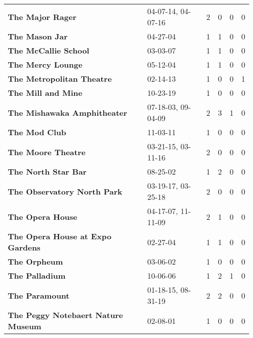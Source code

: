 \begin{supertabular}{p{0.4\textwidth}p{0.3\textwidth}p{0.05\textwidth}p{0.05\textwidth}p{0.05\textwidth}p{0.05\textwidth}}
                                             \textbf{The Major Rager} &  04-07-14, 04-07-16 &  2 &  0 &  0 &  0 \\
                                               \textbf{The Mason Jar} &            04-27-04 &  1 &  1 &  0 &  0 \\
                                         \textbf{The McCallie School} &            03-03-07 &  1 &  1 &  0 &  0 \\
                                            \textbf{The Mercy Lounge} &            05-12-04 &  1 &  1 &  0 &  0 \\
                                    \textbf{The Metropolitan Theatre} &            02-14-13 &  1 &  0 &  0 &  1 \\
                                           \textbf{The Mill and Mine} &            10-23-19 &  1 &  0 &  0 &  0 \\
                                  \textbf{The Mishawaka Amphitheater} &  07-18-03, 09-04-09 &  2 &  3 &  1 &  0 \\
                                                \textbf{The Mod Club} &            11-03-11 &  1 &  0 &  0 &  0 \\
                                           \textbf{The Moore Theatre} &  03-21-15, 03-11-16 &  2 &  0 &  0 &  0 \\
                                          \textbf{The North Star Bar} &            08-25-02 &  1 &  2 &  0 &  0 \\
                                  \textbf{The Observatory North Park} &  03-19-17, 03-25-18 &  2 &  0 &  0 &  0 \\
                                             \textbf{The Opera House} &  04-17-07, 11-11-09 &  2 &  1 &  0 &  0 \\
                             \textbf{The Opera House at Expo Gardens} &            02-27-04 &  1 &  1 &  0 &  0 \\
                                                 \textbf{The Orpheum} &            03-06-02 &  1 &  0 &  0 &  0 \\
                                               \textbf{The Palladium} &            10-06-06 &  1 &  2 &  1 &  0 \\
                                               \textbf{The Paramount} &  01-18-15, 08-31-19 &  2 &  2 &  0 &  0 \\
                           \textbf{The Peggy Notebaert Nature Museum} &            02-08-01 &  1 &  0 &  0 &  0 \\

\end{supertabular}

